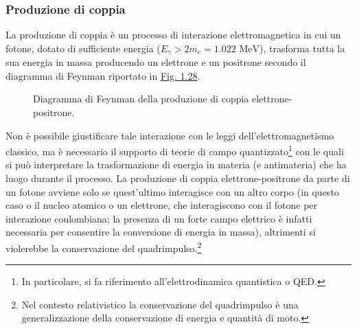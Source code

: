\documentclass[12pt,a4paper,twoside]{report}
\begin{document}
	\subsubsection{Produzione di coppia}
	La produzione di coppia è un processo di interazione elettromagnetica in cui un fotone, dotato di sufficiente energia ($E_\gamma>2m_e=1.022\mbox{ MeV}$), trasforma tutta la sua energia in massa producendo un elettrone e un positrone secondo il diagramma di Feynman riportato in \hyperref[fig:feynman]{Fig. 1.28}.
	\begin{figure}
		\centering
		\caption{Diagramma di Feynman della produzione di coppia elettrone-positrone.}
		\label{fig:feynman}
	\end{figure}
	Non è possibile giustificare tale interazione con le leggi dell'elettromagnetismo classico, ma è necessario il supporto di teorie di campo quantizzato\footnote{In particolare, si fa riferimento all'elettrodinamica quantistica o QED.} con le quali si può interpretare la trasformazione di energia in materia (e antimateria) che ha luogo durante il processo. La produzione di coppia elettrone-positrone da parte di un fotone avviene solo se quest'ultimo interagisce con un altro corpo (in questo caso o il nucleo atomico o un elettrone, che interagiscono con il fotone per interazione coulombiana; la presenza di un forte campo elettrico è infatti necessaria per consentire la conversione di energia in massa), altrimenti si violerebbe la conservazione del quadrimpulso.\footnote{Nel contesto relativistico la conservazione del quadrimpulso è una generalizzazione della conservazione di energia e quantità di moto.}
	
\end{document}
